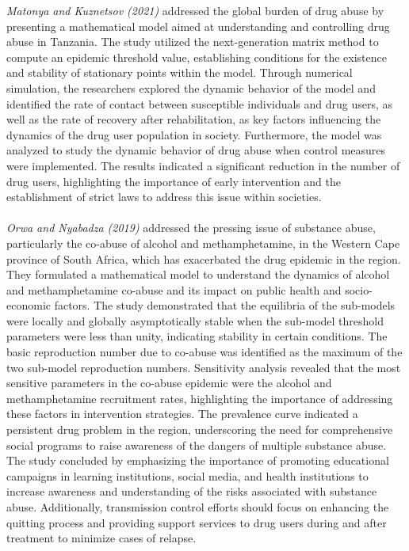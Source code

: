 \documentclass[12pt]{report}
\begin{document}
\textit{Matonya and Kuznetsov (2021)} addressed the global burden of drug abuse by presenting a mathematical model aimed at understanding and controlling drug abuse in Tanzania. The study utilized the next-generation matrix method to compute an epidemic threshold value, establishing conditions for the existence and stability of stationary points within the model. Through numerical simulation, the researchers explored the dynamic behavior of the model and identified the rate of contact between susceptible individuals and drug users, as well as the rate of recovery after rehabilitation, as key factors influencing the dynamics of the drug user population in society. Furthermore, the model was analyzed to study the dynamic behavior of drug abuse when control measures were implemented. The results indicated a significant reduction in the number of drug users, highlighting the importance of early intervention and the establishment of strict laws to address this issue within societies.\\\\
\textit{Orwa and Nyabadza (2019)} addressed the pressing issue of substance abuse, particularly the co-abuse of alcohol and methamphetamine, in the Western Cape province of South Africa, which has exacerbated the drug epidemic in the region. They formulated a mathematical model to understand the dynamics of alcohol and methamphetamine co-abuse and its impact on public health and socio-economic factors.
The study demonstrated that the equilibria of the sub-models were locally and globally asymptotically stable when the sub-model threshold parameters were less than unity, indicating stability in certain conditions. The basic reproduction number due to co-abuse was identified as the maximum of the two sub-model reproduction numbers.
Sensitivity analysis revealed that the most sensitive parameters in the co-abuse epidemic were the alcohol and methamphetamine recruitment rates, highlighting the importance of addressing these factors in intervention strategies. The prevalence curve indicated a persistent drug problem in the region, underscoring the need for comprehensive social programs to raise awareness of the dangers of multiple substance abuse.
The study concluded by emphasizing the importance of promoting educational campaigns in learning institutions, social media, and health institutions to increase awareness and understanding of the risks associated with substance abuse. Additionally, transmission control efforts should focus on enhancing the quitting process and providing support services to drug users during and after treatment to minimize cases of relapse.\\\\
\end{document}
